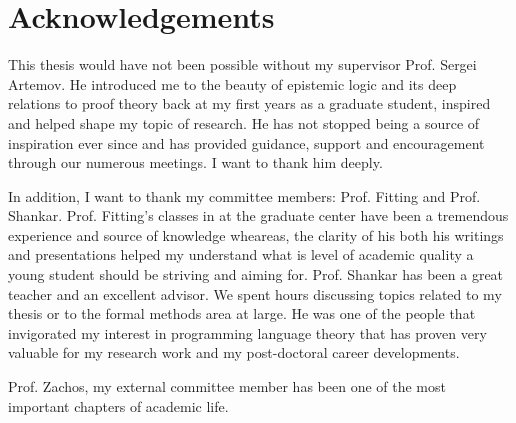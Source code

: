 \section*{Acknowledgements}
This thesis would have not been possible without my supervisor Prof. Sergei Artemov.
He introduced me to the beauty of epistemic logic and its deep relations to proof theory
back at my first years as a graduate student, inspired and helped shape my topic of research. 
He has not stopped being a source of inspiration ever
since and has provided guidance, support and encouragement through our numerous meetings. 
I want to thank him deeply.

In addition, I want to thank my committee members: Prof. Fitting and Prof. Shankar. Prof. Fitting's classes
in at the graduate center have been a tremendous experience and source of knowledge wheareas,
the clarity of his both his writings and presentations helped my understand what is 
level of academic quality a young student should be striving and aiming for. Prof. Shankar has
been a great teacher and an excellent advisor. We spent hours 
discussing topics related to my thesis or to the formal methods area at large. He was one
of the people that invigorated my interest in programming language theory that has
proven very valuable for my research work and my post-doctoral career developments.

Prof. Zachos, my external committee member has been one of the most important
chapters of academic life. 
